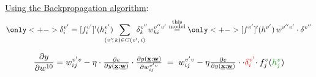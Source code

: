 \begin{frame}\frametitle{\secname}
	\underline{Using the Backpropagation algorithm}:
	    \begin{equation}
            \only<+->{
        {\delta_i^{v'}}
        =
        [f_i^{v'}]'({h_i^{v'}}) 
        \kern-3ex\sum_{(v''\hspace{-1mm},\,k) \in C(v',\,i)}\kern-3ex
        {\delta_k^{v''}} 
        {w}_{ki}^{v'' v'}
        }
            \stackrel{{
    \substack{\text{this}\\ \text{model}}}
    }{=} 
            \only<+->{
            [f^{v'}]'({h^{v'}}) \,
        {w}^{v'' v'} \cdot
    {\delta^{v''}} 
            }
    \end{equation}
    
    \begin{equation}
     \frac{\partial y}{\partial w^{10}} = 				{w}_{ij}^{v'v} - \eta \cdot
				\smallfrac{\partial e}{\partial y(\vec{x}; \vec{w})} \cdot
				\smallfrac{\partial y(\vec{x}; \vec{w})}{\partial{w}_{ij}^{v'v}}
				\;=\; {w}_{ij}^{v'v} - \eta \smallfrac{\partial e}{\partial y(\vec{x}; \vec{w})} \cdot \cdot
				{\color{red} \delta_i^{v'}} \kern-.5ex\cdot
			   			f_j^v( {\color{darkgreen}h_j^v} )
    \end{equation}
\end{frame}
